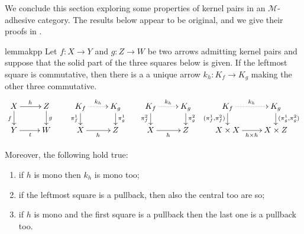 \documentclass[a4paper,UKenglish,cleveref,pdftex,thm-restate,numberwithinsect]{lipics-v2021}
\def\D{\textbf {\textup{D}}}
\def\X{\textbf {\textup{X}}}
\newcommand{\commentato}[1]{ {} }
\begin{document}
\commentato{ 
\begin{restatable}{corollary}{natepi}\label{cor:reg_epi_components_reg_epi_nat_trans}
    Let $\X$ be a category with pullbacks and $\phi\colon F \to G$ a natural transformation between functors $F, G: \D \rightrightarrows \X$. If $\phi_d$ is a regular epi for every $d$, then $\phi$ is a regular epi.
\end{restatable}

From the previous result we deduce that the class of regular epis is closed under colimits.

\begin{restatable}{lemma}{epicol}\label{lemma:nat_trans_reg_epi_canonical_arrow_reg_epi}
    Let $F,G\colon \D\rightrightarrows \X$ be two diagrams, and suppose that $\X$ has all colimits of shape $\D$. Let $(X, \{x_d\}_{d \in \D})$ and $(Y, \{y_d\}_{d\in D})$ be the colimits of $F$ and $G$, respectively.  If $\phi\colon  F \to G$ is a natural transformation whose components are regular epis, then the arrow induced by $\phi$ from $X$ to $Y$ is a regular epi.
\end{restatable}
}
We conclude this section exploring some properties of kernel pairs in an $\mathcal{M}$-adhesive category. 
The results below appear to be original, and we give their proofs in .

\begin{restatable}{lemma}{kpp}\label{lemma:kern_pairs_pres_pullbacks}
	Let $f\colon X \to Y$ and $g\colon Z \to W$ be two arrows admitting kernel pairs and suppose that the solid part of the three squares below is given. 
	If the leftmost square is commutative, then there is a a unique arrow $k_h\colon K_f \to K_g$ making the other three commutative.
	\[\xymatrix@R=15pt{X \ar[r]^{h}\ar[d]_{f}& Z \ar[d]^{g} & K_f \ar@{.>}[r]^{k_h} \ar[d]_{\pi^1_f}& K_g \ar[d]^{\pi^1_g} & K_f  \ar@{.>}[r]^{k_h} \ar[d]_{\pi^2_f}& K_g \ar[d]^{\pi^2_g}& K_f  \ar@{.>}[r]^{k_h} \ar[d]_{(\pi^1_f,\pi^2_f)} & K_g \ar[d]^{(\pi^1_g, \pi^2_g)}\\ Y \ar[r]_t& W & X \ar[r]_{h} & Z & X\ar[r]_{h} &Z & X\times X \ar[r]_{h\times h}& X\times Z}\]
	
		Moreover, the following hold true:
		\begin{enumerate}
			\item if $h$ is mono then $k_h$ is mono too;
			\item if the leftmost square is a pullback, then also the central too are so;
			\item if $h$ is mono and the first square is a pullback then the last one is a pullback too.
		\end{enumerate} 
\end{restatable}
\end{document}
